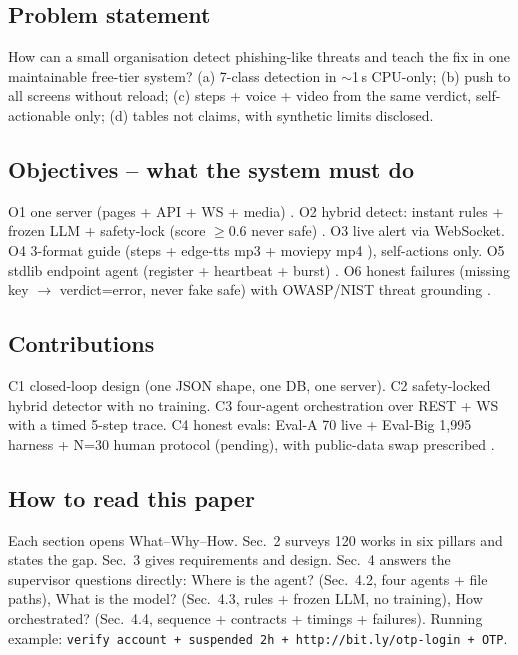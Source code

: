 \documentclass[11pt,a4paper]{article}
\begin{document}
\subsection{Problem statement}
How can a small organisation detect phishing-like threats and teach the fix in one maintainable free-tier system? (a) 7-class detection in $\sim$1\,s CPU-only; (b) push to all screens without reload; (c) steps + voice + video from the same verdict, self-actionable only; (d) tables not claims, with synthetic limits disclosed.

\subsection{Objectives -- what the system must do}
O1 one server (pages + API + WS + media) \cite{FastAPI24,Docker24}. O2 hybrid detect: instant rules + frozen LLM + safety-lock (score $\ge$0.6 never safe) \cite{Hasan25,StruQ24}. O3 live alert via WebSocket. O4 3-format guide (steps + edge-tts mp3 \cite{EdgeTTS24} + moviepy mp4 \cite{Moviepy24}), self-actions only. O5 stdlib endpoint agent (register + heartbeat + burst) \cite{PyStd24}. O6 honest failures (missing key $\rightarrow$ verdict=error, never fake safe) with OWASP/NIST threat grounding \cite{OWASP24,NIST24,OWASPASVS24,NISTCSF24}.

\subsection{Contributions}
C1 closed-loop design (one JSON shape, one DB, one server). C2 safety-locked hybrid detector with no training. C3 four-agent orchestration over REST + WS with a timed 5-step trace. C4 honest evals: Eval-A 70 live + Eval-Big 1,995 harness + N=30 human protocol (pending), with public-data swap prescribed \cite{FinFraud25,FraudR125}.

\subsection{How to read this paper}
Each section opens What--Why--How. Sec.~2 surveys 120 works in six pillars and states the gap. Sec.~3 gives requirements and design. Sec.~4 answers the supervisor questions directly: Where is the agent? (Sec.~4.2, four agents + file paths), What is the model? (Sec.~4.3, rules + frozen LLM, no training), How orchestrated? (Sec.~4.4, sequence + contracts + timings + failures). Running example: \texttt{verify account + suspended 2h + http://bit.ly/otp-login + OTP}.
\end{document}
